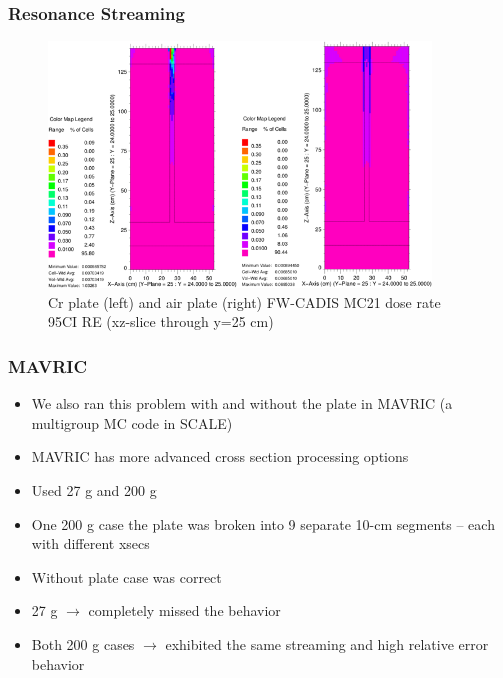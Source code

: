 \documentclass[xcolor=x11names,compress]{beamer}
\renewcommand{\(}{\begin{columns}}
\renewcommand{\)}{\end{columns}}
\newcommand{\<}[1]{\begin{column}{#1}}
\renewcommand{\>}{\end{column}}
\begin{document}
\begin{frame}[fragile]
  \frametitle{Resonance Streaming}
   \begin{figure}[p]
   \begin{center}
     \includegraphics[width=4in,clip]{NSE13-109R1-CrAir}
   \end{center}
   \caption{Cr plate (left) and air plate (right) FW-CADIS MC21 dose rate 95CI RE (xz-slice through y=25 cm)}
   \label{fig:CrAir}
 \end{figure}
\end{frame}

\begin{frame}[fragile]
  \frametitle{MAVRIC}
  
  \begin{itemize}
  \item We also ran this problem with and without the plate in MAVRIC (a multigroup MC code in SCALE)
  \item MAVRIC has more advanced cross section processing options
  \item Used 27 g and 200 g
  \item One 200 g case the plate was broken into 9 separate 10-cm segments – each with different xsecs
  \item Without plate case was correct
  \item 27 g $\rightarrow$ completely missed the behavior
  \item Both 200 g cases $\rightarrow$ exhibited the same streaming and high relative error behavior
  \end{itemize}
  
\end{frame}
\end{document}
